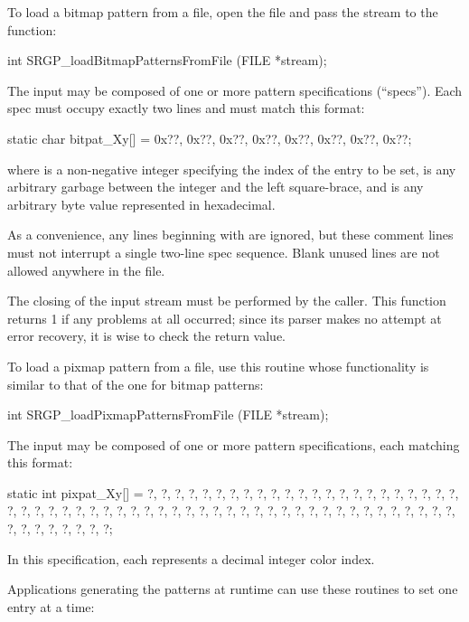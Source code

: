 \newpar
To load a bitmap pattern from a file, open the file and pass the stream to the function:

\begincode
int SRGP_loadBitmapPatternsFromFile (FILE *stream);
\endcode

\newpar
The input may be composed of one or more pattern specifications (``specs'').
Each spec must occupy exactly two lines and must match this format:

\begintinycode
static char bitpat_Xy[] = \lb
   0x??, 0x??, 0x??, 0x??, 0x??, 0x??, 0x??, 0x??\rb;
\endcode

\noindent
where  is a non-negative integer specifying the index of the entry to
be set,  is any arbitrary garbage between the integer and the left
square-brace, and  is any arbitrary byte value represented in
hexadecimal.

\newpar
As a convenience, any lines beginning with \cmd{\#} are ignored, but these
comment lines must not interrupt a single two-line spec sequence.  Blank unused
lines are not allowed anywhere in the file.

\newpar
The closing of the input stream must be performed by the caller.
This function returns 1 if any problems at all occurred; since its parser makes
no attempt at error recovery, it is wise to check the return value.



\newpar
To load a pixmap pattern from a file, use this routine whose functionality
is similar to that of the one for bitmap patterns:

\begincode
int SRGP_loadPixmapPatternsFromFile (FILE *stream);
\endcode

\newpar
{}
The input may be composed of one or more pattern specifications, each matching
this format:

\begintinycode
static int pixpat_Xy[] = \lb
   ?, ?, ?, ?, ?, ?, ?, ?,
   ?, ?, ?, ?, ?, ?, ?, ?,
   ?, ?, ?, ?, ?, ?, ?, ?,
   ?, ?, ?, ?, ?, ?, ?, ?,
   ?, ?, ?, ?, ?, ?, ?, ?,
   ?, ?, ?, ?, ?, ?, ?, ?,
   ?, ?, ?, ?, ?, ?, ?, ?,
   ?, ?, ?, ?, ?, ?, ?, ?\rb;
\endcode

\noindent
In this specification, each  represents a decimal integer color index.

\newpar
Applications generating the patterns at runtime can use these routines to set
one entry at a time:


